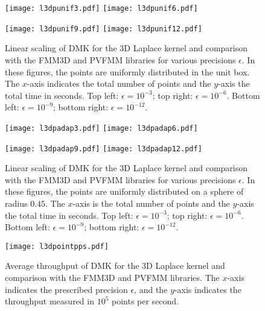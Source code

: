 \documentclass[final,letterpaper]{siamart171218}
\newcommand{\acron}{DMK }
\begin{document}
\begin{figure}[!ht]
\centering
\texttt{[image: l3dpunif3.pdf]}
\hspace{0.4in}
\texttt{[image: l3dpunif6.pdf]}

\vspace{5mm}

\texttt{[image: l3dpunif9.pdf]}
\hspace{0.4in}
\texttt{[image: l3dpunif12.pdf]}
\caption{\sf Linear scaling of \acron for the 3D Laplace kernel
  and comparison with the FMM3D and PVFMM libraries for various 
  precisions $\epsilon$. In these figures, the points are uniformly distributed
  in the unit box. The $x$-axis indicates the total number of points and
  the $y$-axis the total time in seconds. 
  Top left: $\epsilon=10^{-3}$;  top right: $\epsilon=10^{-6}$.
  Bottom left: $\epsilon=10^{-9}$;  bottom right: $\epsilon=10^{-12}$.}
\label{l3dpunif}
\end{figure}

\begin{figure}[!ht]
\centering
\texttt{[image: l3dpadap3.pdf]}
\hspace{0.4in}
\texttt{[image: l3dpadap6.pdf]}

\vspace{5mm}

\texttt{[image: l3dpadap9.pdf]}
\hspace{0.4in}
\texttt{[image: l3dpadap12.pdf]}
\caption{\sf Linear scaling of \acron for the 3D Laplace kernel
  and comparison with the FMM3D and PVFMM libraries for various 
  precisions $\epsilon$. In these figures, the points are uniformly distributed
  on a sphere of radius $0.45$. The $x$-axis is the total number of points and
  the $y$-axis the total time in seconds. 
  Top left: $\epsilon=10^{-3}$;  top right: $\epsilon=10^{-6}$.
  Bottom left: $\epsilon=10^{-9}$;  bottom right: $\epsilon=10^{-12}$.}
\label{l3dpadap}
\end{figure}

\begin{figure}[!ht]
\centering
\texttt{[image: l3dpointpps.pdf]}
\caption{\sf Average throughput of \acron for the 3D Laplace kernel
  and comparison with the FMM3D and PVFMM libraries. 
  The $x$-axis indicates the prescribed precision $\epsilon$, and
  the $y$-axis indicates the throughput measured in $10^5$ points per second.} 
\label{l3dpointpps}
\end{figure}
\end{document}
